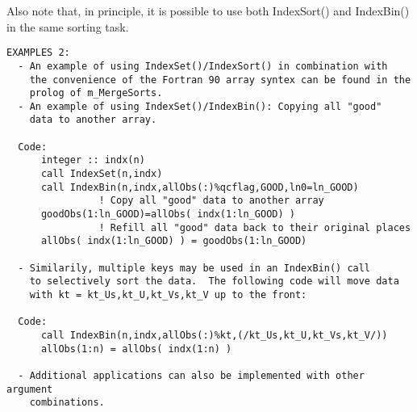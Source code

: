 Also note that, in principle, it is possible to use both IndexSort() and 
IndexBin() in the same sorting task.
%
\begin{verbatim}
EXAMPLES 2:
  - An example of using IndexSet()/IndexSort() in combination with
    the convenience of the Fortran 90 array syntex can be found in the
    prolog of m_MergeSorts.
  - An example of using IndexSet()/IndexBin(): Copying all "good"
    data to another array.

  Code:
      integer :: indx(n)
      call IndexSet(n,indx)
      call IndexBin(n,indx,allObs(:)%qcflag,GOOD,ln0=ln_GOOD)
                ! Copy all "good" data to another array
      goodObs(1:ln_GOOD)=allObs( indx(1:ln_GOOD) )
                ! Refill all "good" data back to their original places
      allObs( indx(1:ln_GOOD) ) = goodObs(1:ln_GOOD)

  - Similarily, multiple keys may be used in an IndexBin() call
    to selectively sort the data.  The following code will move data
    with kt = kt_Us,kt_U,kt_Vs,kt_V up to the front:

  Code:
      call IndexBin(n,indx,allObs(:)%kt,(/kt_Us,kt_U,kt_Vs,kt_V/))
      allObs(1:n) = allObs( indx(1:n) )

  - Additional applications can also be implemented with other argument 
    combinations.
\end{verbatim} 
%

